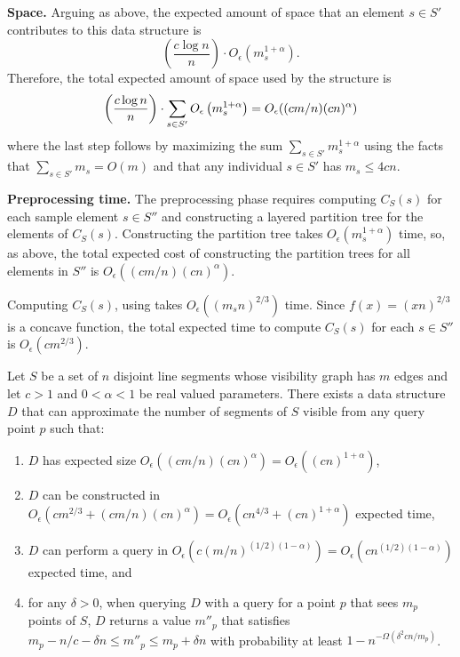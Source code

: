 \documentclass{patmorin}
\newcommand{\Oe}{O_\epsilon}
\begin{document}
\noindent\textbf{Space.}
Arguing as above, the expected amount of space that an element $s\in S'$
contributes to this data structure is
\[
    \left(\frac{c\log n}{n}\right)\cdot \Oe\left(m_s^{1+\alpha}\right).
\]
Therefore, the total expected amount of space used by the structure is
\begin{equation}
    \left(\frac{c\log n}{n}\right)\cdot \sum_{s\in S'}\Oe\left(m_s^{1+\alpha}\right)
     = \Oe((cm/n)(cn)^\alpha) \eqlabel{space-convex}
\end{equation}
where the last step follows by maximizing the sum $\sum_{s\in
S'}m_s^{1+\alpha}$ using the facts that $\sum_{s\in S'} m_s = O(m)$ and that
any individual $s\in S'$ has $m_s \le 4cn$. \smallbreak

\noindent\textbf{Preprocessing time.}
The preprocessing phase requires computing $C_S(s)$ for each sample element
$s\in S''$ and constructing a layered partition tree for the elements of
$C_S(s)$.  Constructing the partition tree takes $\Oe(m_s^{1+\alpha})$
time, so, as above, the total expected cost of constructing the partition
trees for all elements in $S''$ is $\Oe((cm/n)(cn)^\alpha)$.

Computing $C_S(s)$, using  takes
$\Oe((m_sn)^{2/3})$ time. Since $f(x) = (xn)^{2/3}$ is a concave function,
the total expected time to compute $C_S(s)$ for each $s\in S''$ is
$\Oe(cm^{2/3})$. %

\begin{thm}
  Let $S$ be a set of $n$ disjoint line segments whose visibility
  graph has $m$ edges and let $c>1$ and $0 < \alpha < 1$ be real valued
  parameters.  There exists a data structure $D$ that can approximate
  the number of segments of $S$ visible from any query point $p$ such that:
  \begin{enumerate}
   \item $D$ has expected size $\Oe((cm/n)(cn)^{\alpha}) =
          \Oe((cn)^{1+\alpha})$,
    \item $D$ can be constructed in
          $\Oe(cm^{2/3} + (cm/n)(cn)^{\alpha}) = \Oe(cn^{4/3} + (cn)^{1+\alpha})$
          expected time,
    \item $D$ can perform a query in $\Oe(c(m/n)^{(1/2)(1-\alpha)}) =
          \Oe(cn^{(1/2)(1-\alpha)})$ expected time, and
    \item for any $\delta > 0$, when querying $D$ with a query for a
          point $p$ that sees $m_p$ points of $S$, $D$
          returns a value
          $m''_p$ that satisfies $m_p - n/c - \delta n \le m''_p \le m_p
          + \delta n$ with probability at
          least $1-n^{-\Omega(\delta^2
          cn/m_p)}$.
   \end{enumerate}
\end{thm}
\end{document}
